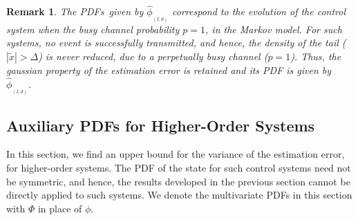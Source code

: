 \documentclass[twocolumn]{autart}
\newtheorem{remark}{Remark}[section]
\begin{document}
\begin{remark}\textbf{}
The PDFs~given by $\hat{\phi}_{_{(I,d)}}$ correspond to the evolution of the control system when the busy channel probability $p=1$, in the Markov model. For such systems, no event is successfully transmitted, and hence, the density of the tail ($|\tilde{x}| > \Delta$) is never reduced, due to a perpetually busy channel ($p=1$). Thus, the gaussian property of the estimation error is retained and its PDF is given by $\hat{\phi}_{_{(I,d)}}$.
\end{remark}

\subsection{Auxiliary PDFs for Higher-Order Systems} \label{SS:PDFmajVector}
In this section, we find an upper bound for the variance of the estimation error, for higher-order systems. The PDF of the state for such control systems need not be symmetric, and hence, the results developed in the previous section cannot be directly applied to such systems. We denote the multivariate PDFs in this section with $\Phi$ in place of $\phi$.
\end{document}
